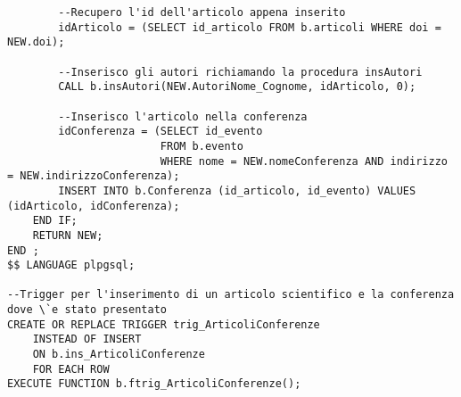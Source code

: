 \begin{lstlisting}
        --Recupero l'id dell'articolo appena inserito
        idArticolo = (SELECT id_articolo FROM b.articoli WHERE doi = NEW.doi);

        --Inserisco gli autori richiamando la procedura insAutori
        CALL b.insAutori(NEW.AutoriNome_Cognome, idArticolo, 0);

        --Inserisco l'articolo nella conferenza
        idConferenza = (SELECT id_evento
                        FROM b.evento
                        WHERE nome = NEW.nomeConferenza AND indirizzo = NEW.indirizzoConferenza);
        INSERT INTO b.Conferenza (id_articolo, id_evento) VALUES (idArticolo, idConferenza);
    END IF;
    RETURN NEW;
END ;
$$ LANGUAGE plpgsql;

--Trigger per l'inserimento di un articolo scientifico e la conferenza dove \`e stato presentato
CREATE OR REPLACE TRIGGER trig_ArticoliConferenze
    INSTEAD OF INSERT
    ON b.ins_ArticoliConferenze
    FOR EACH ROW
EXECUTE FUNCTION b.ftrig_ArticoliConferenze();
\end{lstlisting}

